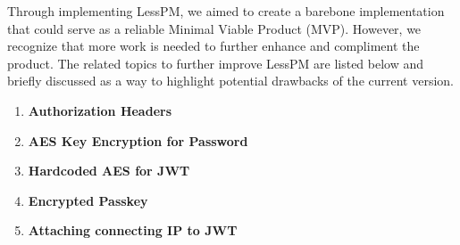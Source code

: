 Through implementing LessPM, we aimed to create a barebone implementation that could serve as a reliable Minimal
    Viable Product (MVP). However, we recognize that more work is needed to further enhance and compliment the product.
    The related topics to further improve LessPM are listed below and briefly discussed as a way to highlight
    potential drawbacks of the current version.

    \begin{enumerate}[label=$\blacktriangleright$]
        \item \textbf{Authorization Headers}
        \item \textbf{AES Key Encryption for Password}
        \item \textbf{Hardcoded AES for JWT}
        \item \textbf{Encrypted Passkey}
        \item \textbf{Attaching connecting IP to JWT}
        \iffalse
        \item \textbf{Credential ID} \newline In its current implementation, LessPM supports a single registered
        authenticator per username to maintain a focused security approach.
        During registration, the server checks the database for an existing username similar to the incoming one
        and aborts the registration ceremony if a match is found.
        While WebAuthn permits users to have multiple authenticators, limiting this feature in the initial iteration of
        LessPM helps ensure a more controlled security environment.
        As the system evolves, considering the addition of support for multiple authenticators can be weighed against
        potential security risks and benefits.
        \fi
    \end{enumerate}